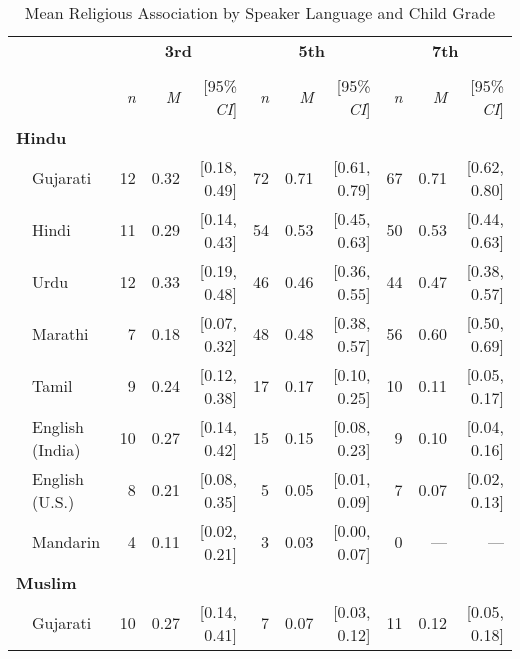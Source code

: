 \thispagestyle{empty}
\begin{table}[t]
\vspace{-20pt}
\centering
\caption{Mean Religious Association by Speaker Language and Child Grade\label{tab:religion-means}}\\
\begin{footnotesize}
\begin{tabular}{p{.1in}lrrrrrrrrr}
\toprule
 &  & \multicolumn{3}{c}{\textbf{3rd}} & \multicolumn{3}{c}{\textbf{5th}} & \multicolumn{3}{c}{\textbf{7th}} \\
\cline{3-5} \cline{6-8} \cline{9-11}\\[-.75em]
&  & \textit{n} & \textit{M} & [95\% \textit{CI}] &  \textit{n} & \textit{M} & [95\% \textit{CI}] &  \textit{n}  & \textit{M} & [95\% \textit{CI}]\\
\midrule
\multicolumn{11}{l}{\textbf{Hindu}}\\
 & Gujarati & 12 & 0.32 & [0.18, 0.49] & 72 & 0.71 & [0.61, 0.79] & 67 & 0.71 & [0.62, 0.80]\\

 & Hindi & 11 & 0.29 & [0.14, 0.43] & 54 & 0.53 & [0.45, 0.63] & 50 & 0.53 & [0.44, 0.63]\\

 & Urdu & 12 & 0.33 & [0.19, 0.48] & 46 & 0.46 & [0.36, 0.55] & 44 & 0.47 & [0.38, 0.57]\\

 & Marathi & 7 & 0.18 & [0.07, 0.32] & 48 & 0.48 & [0.38, 0.57] & 56 & 0.60 & [0.50, 0.69]\\

 & Tamil & 9 & 0.24 & [0.12, 0.38] & 17 & 0.17 & [0.10, 0.25] & 10 & 0.11 & [0.05, 0.17]\\

 & English (India) & 10 & 0.27 & [0.14, 0.42] & 15 & 0.15 & [0.08, 0.23] & 9 & 0.10 & [0.04, 0.16]\\

 & English (U.S.) & 8 & 0.21 & [0.08, 0.35] & 5 & 0.05 & [0.01, 0.09] & 7 & 0.07 & [0.02, 0.13]\\

& Mandarin & 4 & 0.11 & [0.02, 0.21] & 3 & 0.03 & [0.00, 0.07] & 0 & --- & ---\\

\midrule
\multicolumn{11}{l}{\textbf{Muslim}}\\
 & Gujarati & 10 & 0.27 & [0.14, 0.41] & 7 & 0.07 & [0.03, 0.12] & 11 & 0.12 & [0.05, 0.18]\\


\end{tabular}
\end{footnotesize}
\end{table}
